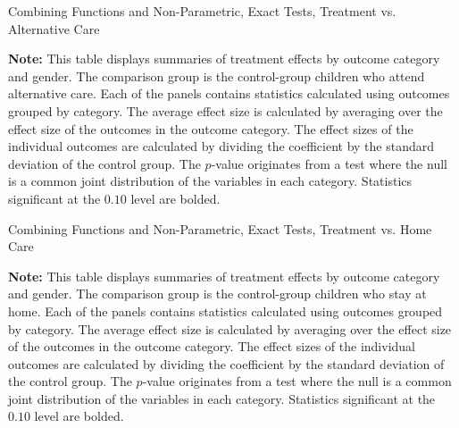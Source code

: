 \begin{table}[!htpb]
\begin{threeparttable}
\caption{Combining Functions and Non-Parametric, Exact Tests, Treatment vs. Alternative Care} \label{table:massivealt}
\centering
  
\begin{tablenotes}
\footnotesize
\item \textbf{Note:} This table displays summaries of treatment effects by outcome category and gender. The comparison group is the control-group children who attend alternative care. Each of the panels contains statistics calculated using outcomes grouped by category. The average effect size is calculated by averaging over the effect size of the outcomes in the outcome category. The effect sizes of the individual outcomes are calculated by dividing the coefficient by the standard deviation of the control group. The \citet{Rosenbaum_2005_Distribution_JRSS} $p$-value originates from a test where the null is a common joint distribution of the variables in each category. Statistics significant at the $0.10$ level are bolded.
\end{tablenotes}
\end{threeparttable}
\end{table}

\begin{table}[!htpb]
\begin{threeparttable}
\caption{Combining Functions and Non-Parametric, Exact Tests, Treatment vs. Home Care} \label{table:massivehome}
\centering
  
\begin{tablenotes}
\footnotesize
\item \textbf{Note:} This table displays summaries of treatment effects by outcome category and gender. The comparison group is the control-group children who stay at home. Each of the panels contains statistics calculated using outcomes grouped by category. The average effect size is calculated by averaging over the effect size of the outcomes in the outcome category. The effect sizes of the individual outcomes are calculated by dividing the coefficient by the standard deviation of the control group. The \citet{Rosenbaum_2005_Distribution_JRSS} $p$-value originates from a test where the null is a common joint distribution of the variables in each category. Statistics significant at the $0.10$ level are bolded.
\end{tablenotes}
\end{threeparttable}
\end{table}



